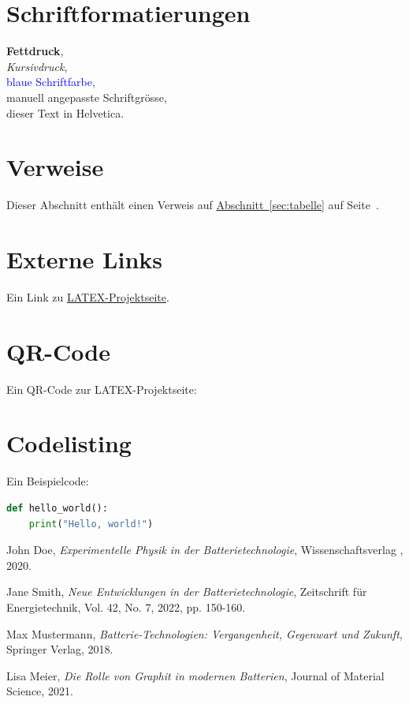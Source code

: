\documentclass[ngerman, a4paper,12pt]{article}
\begin{document}
\section{Schriftformatierungen}
\textbf{Fettdruck}, \\
\textit{Kursivdruck}, \\
\textcolor{blue}{blaue Schriftfarbe}, \\
\Large manuell angepasste Schriftgrösse, \\
\textsf{dieser Text in Helvetica.}

\section{Verweise}
Dieser Abschnitt enthält einen Verweis auf \hyperref[sec:tabelle]{Abschnitt~\ref*{sec:tabelle}} auf Seite~\pageref{sec:tabelle}.

\section{Externe Links}
Ein Link zu \href{https://www.latex-project.org}{LATEX-Projektseite}.

\section{QR-Code}
Ein QR-Code zur LATEX-Projektseite:

\newpage

\section{Codelisting}
Ein Beispielcode:
\begin{lstlisting}[language=Python, caption={Beispielcode in Python}]
def hello_world():
    print("Hello, world!")
\end{lstlisting}

\newpage

\begin{thebibliography}{99}


 John Doe, \textit{Experimentelle Physik in der Batterietechnologie}, Wissenschaftsverlag , 2020.

 Jane Smith, \textit{Neue Entwicklungen in der Batterietechnologie}, Zeitschrift für Energietechnik, Vol. 42, No. 7, 2022, pp. 150-160.

 Max Mustermann, \textit{Batterie-Technologien: Vergangenheit, Gegenwart und Zukunft}, Springer Verlag, 2018.

 Lisa Meier, \textit{Die Rolle von Graphit in modernen Batterien}, Journal of Material Science, 2021.

\end{thebibliography}

\newpage
\printindex
\end{document}
